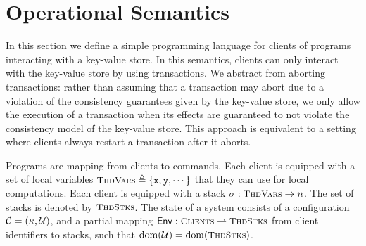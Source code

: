 
\section{Operational Semantics}
\label{sec:semantics}
In this section we define a simple programming language for clients of 
programs interacting with a key-value store. In this semantics, 
clients can only interact with the key-value store by using transactions. 
We abstract from aborting transactions: rather than assuming that a transaction 
may abort due to a violation of the consistency guarantees given by the key-value store, 
we only allow the execution of a transaction when its effects are guaranteed to not violate 
the consistency model of the key-value store. This approach is equivalent to a setting where 
clients always restart a transaction after it aborts.

Programs are mapping from clients to commands. Each
client is equipped with a set of local variables $\ThreadVars \defeq \{\pvar{x}, \pvar{y}, \cdots\}$ 
that they can use for local computations. Each client is equipped with a stack 
$\thdstack: \ThreadVars \rightarrow \nat$. The set of stacks is denoted by $\ThdStacks$. 
The state of a system consists of a configuration 
$\mathcal{C} = (\kappa, \mathcal{U})$, and a partial mapping $\Env: \tidset \rightharpoonup \ThdStacks$ from client identifiers to stacks, 
such that $\dom(\viewFun) = \dom(\ThdStacks)$.

